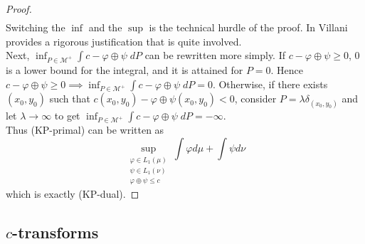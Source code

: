 \documentclass{article}
\theoremstyle{definition}
\theoremstyle{remark}
\begin{document}
\begin{proof}
$$\begin{aligned}
\end{aligned}$$
Switching the $\inf$ and the $\sup$ is the technical hurdle of the proof. In \cite{villani2003topics} Villani provides a rigorous justification that is quite involved. \\
Next, $\inf_{P\in \mathcal M^+}   \int c - \varphi\oplus \psi\; dP$ can be rewritten more simply. If $c - \varphi\oplus \psi \geq 0$, $0$ is a lower bound for the integral, and it is attained for $P=0$. Hence $c - \varphi\oplus \psi \geq 0 \implies \inf_{P\in \mathcal M^+}   \int c - \varphi\oplus \psi\; dP = 0$. Otherwise, if there exists $(x_0,y_0)$ such that $c(x_0,y_0) - \varphi\oplus \psi(x_0,y_0) <0$, consider $P=\lambda \delta_{(x_0,y_0)}$ and let $\lambda \to \infty$ to get $\inf_{P\in \mathcal M^+}   \int c - \varphi\oplus \psi\; dP = -\infty$.\\
Thus (KP-primal) can be written as $$\sup_{\substack{\varphi \in L_1(\mu)\\ \psi \in L_1(\nu)\\ \varphi \oplus \psi \leq c}} \int \varphi d\mu + \int \psi d\nu$$
which is exactly (KP-dual).
\end{proof}

\subsection{$c$-transforms}
\end{document}
